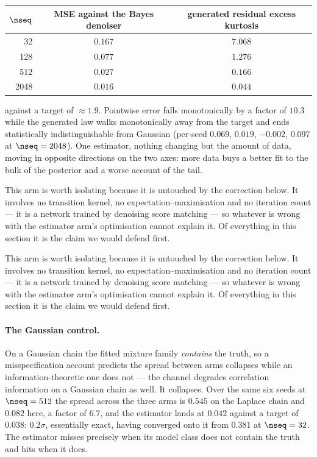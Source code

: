 \documentclass{article}
\begin{document}
\begin{center}\small
\begin{tabular}{@{}rcc@{}}
\toprule
$\nseq$ & MSE against the Bayes denoiser & generated residual excess kurtosis \\
\midrule
32   & $0.167$ & $7.068$ \\
128  & $0.077$ & $1.276$ \\
512  & $0.027$ & $0.166$ \\
2048 & $0.016$ & $0.044$ \\
\bottomrule
\end{tabular}
\end{center}

\noindent
against a target of ${\approx}1.9$. Pointwise error falls monotonically by a factor of $10.3$
while the generated law walks monotonically away from the target and ends statistically
indistinguishable from Gaussian (per-seed $0.069$, $0.019$, $-0.002$, $0.097$ at $\nseq=2048$).
One estimator, nothing changing but the amount of data, moving in opposite directions on the two
axes: more data buys a better fit to the bulk of the posterior and a worse account of the tail.

This arm is worth isolating because it is untouched by the correction below. It involves no
transition kernel, no expectation--maximisation and no iteration count --- it is a network trained
by denoising score matching --- so whatever is wrong with the estimator arm's optimisation cannot
explain it. Of everything in this section it is the claim we would defend first.

This arm is worth isolating because it is untouched by the correction below. It involves no
transition kernel, no expectation--maximisation and no iteration count --- it is a network trained
by denoising score matching --- so whatever is wrong with the estimator arm's optimisation cannot
explain it. Of everything in this section it is the claim we would defend first.


\paragraph{The Gaussian control.} On a Gaussian chain the fitted mixture family \emph{contains}
the truth, so a misspecification account predicts the spread between arms collapses while an
information-theoretic one does not --- the channel degrades correlation information on a Gaussian
chain as well. It collapses. Over the same six seeds at $\nseq=512$ the spread across the three
arms is $0.545$ on the Laplace chain and $0.082$ here, a factor of $6.7$, and the estimator lands
at $0.042$ against a target of $0.038$: $0.2\sigma$, essentially exact, having converged onto it
from $0.381$ at $\nseq=32$. The estimator misses precisely when its model class does not contain
the truth and hits when it does.
\end{document}
